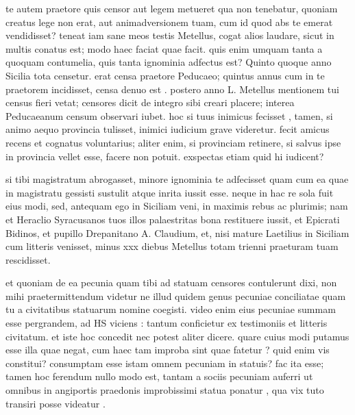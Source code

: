  te autem praetore quis censor aut legem metueret qua non tenebatur, quoniam creatus lege non erat, aut animadversionem tuam, cum id quod abs te emerat vendidisset? teneat iam sane meos testis Metellus, cogat alios laudare, sicut in multis conatus est; modo haec faciat quae facit. quis enim umquam tanta a quoquam contumelia, quis tanta ignominia adfectus est? Quinto quoque anno Sicilia tota censetur. erat censa praetore Peducaeo; quintus annus cum in te praetorem incidisset, censa denuo est . postero anno L. Metellus mentionem tui census fieri vetat; censores dicit de integro sibi creari placere; interea Peducaeanum censum observari iubet. hoc si tuus inimicus fecisset , tamen, si animo aequo provincia tulisset, inimici iudicium grave videretur. fecit amicus recens et cognatus voluntarius; aliter enim, si provinciam retinere, si salvus ipse in provincia vellet esse, facere non potuit. exspectas etiam quid hi iudicent?

 si tibi magistratum abrogasset, minore ignominia te adfecisset quam cum ea quae in magistratu gessisti sustulit atque inrita iussit esse. neque in hac re sola fuit eius modi, sed, antequam ego in Siciliam veni, in maximis rebus ac plurimis; nam et Heraclio Syracusanos tuos illos palaestritas bona restituere iussit, et Epicrati Bidinos, et pupillo Drepanitano A. Claudium, et, nisi mature Laetilius in Siciliam cum litteris venisset, minus xxx diebus Metellus totam trienni praeturam tuam rescidisset.

 et quoniam de ea pecunia quam tibi ad statuam censores contulerunt dixi, non mihi praetermittendum videtur ne illud quidem genus pecuniae conciliatae quam tu a civitatibus statuarum nomine coegisti. video enim eius pecuniae summam esse pergrandem, ad HS viciens : tantum conficietur ex testimoniis et litteris civitatum. et iste hoc concedit nec potest aliter dicere. quare cuius modi putamus esse illa quae negat, cum haec tam improba sint quae fatetur ? quid enim vis constitui? consumptam esse istam omnem pecuniam in statuis? fac ita esse; tamen hoc ferendum nullo modo est, tantam a sociis pecuniam auferri ut omnibus in angiportis praedonis improbissimi statua ponatur , qua vix tuto transiri posse videatur .

